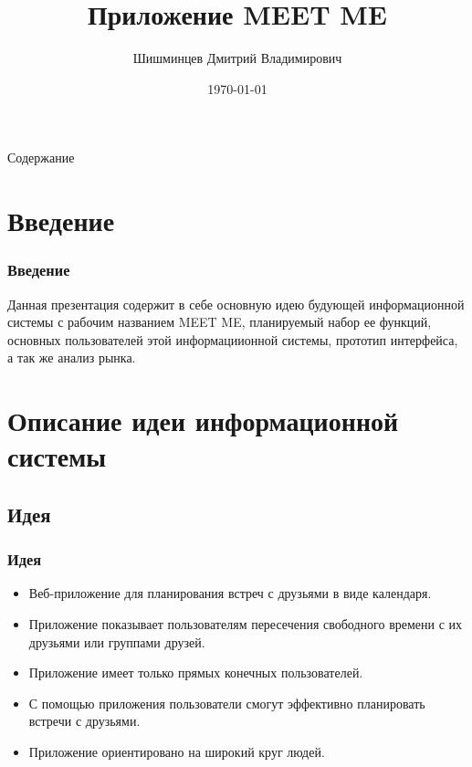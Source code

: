 \documentclass[aspectratio=169]{beamer}
\title[ITMO LaTex]{Приложение MEET ME}
\author[Шишминцев Д. В.]{Шишминцев Дмитрий Владимирович}
\date{\today}
\begin{document}

\begin{frame}[plain]
    \titlepage
\end{frame}





\begin{frame}{Содержание}
    \tableofcontents
\end{frame}





\section{Введение}

\begin{frame}
\frametitle{Введение}
Данная презентация содержит в себе основную идею будующей информационной системы с рабочим названием MEET ME, планируемый набор ее функций, основных пользователей этой информациионной системы, прототип интерфейса, а так же анализ рынка.

\end{frame}


\section{Описание идеи информационной системы}

\subsection{Идея}
\begin{frame}
\frametitle{Идея}
\begin{itemize}
    \item Веб-приложение для планирования встреч с друзьями в виде календаря. 
    \item Приложение показывает пользователям пересечения свободного времени с их друзьями или группами друзей.
    \item Приложение имеет только прямых конечных пользователей.
    \item С помощью приложения пользователи смогут эффективно планировать встречи с друзьями.
    \item Приложение ориентировано на широкий круг людей.
\end{itemize}
    
\end{frame}
\end{document}
